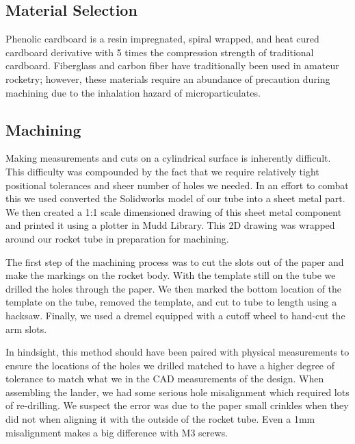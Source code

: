 \subsection{Material Selection}

Phenolic cardboard is a resin impregnated, spiral wrapped, and heat cured cardboard derivative with 5 times the compression strength of traditional cardboard. Fiberglass and carbon fiber have traditionally been used in amateur rocketry; however, these materials require an abundance of precaution during machining due to the inhalation hazard of microparticulates.

\subsection{Machining}

Making measurements and cuts on a cylindrical surface is inherently difficult. This difficulty was compounded by the fact that we require relatively tight positional tolerances and sheer number of holes we needed. In an effort to combat this we used converted the Solidworks model of our tube into a sheet metal part. We then created a 1:1 scale dimensioned drawing of this sheet metal component and printed it using a plotter in Mudd Library. This 2D drawing was wrapped around our rocket tube in preparation for machining. 

The first step of the machining process was to cut the slots out of the paper and make the markings on the rocket body. With the template still on the tube we drilled the holes through the paper. We then marked the bottom location of the template on the tube, removed the template, and cut to tube to length using a hacksaw. Finally, we used a dremel equipped with a cutoff wheel to hand-cut the arm slots. 

In hindsight, this method should have been paired with physical measurements to ensure the locations of the holes we drilled matched to have a higher degree of tolerance to match what we in the CAD measurements of the design. When assembling the lander, we had some serious hole misalignment which required lots of re-drilling. We suspect the error was due to the paper small crinkles when they did not when aligning it with the outside of the rocket tube. Even a 1mm misalignment makes a big difference with M3 screws.
